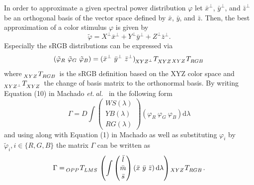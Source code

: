 \documentclass{sig-alternate-05-2015}
\newcommand{\etal}{\textit{et. al.}}
\newcommand{\dlambda}{\mathrm{d}\lambda}
\begin{document}
In order to approximate a given spectral power distribution $\varphi$ let $\bar x^\perp$, $\bar y^\perp$, and $\bar z^\perp$ be an orthogonal basis of the vector space defined by $\bar x$, $\bar y$, and $\bar z$.
Then, the best approximation of a color stimulus $\varphi$ is given by
\begin{equation}
    \tilde\varphi = X^\perp \bar x^\perp + Y^\perp \bar y^\perp + Z^\perp \bar z^\perp.
\end{equation}
Especially the sRGB distributions can be expressed via
\begin{equation}
    (\tilde\varphi_R\ \tilde\varphi_G\ \tilde\varphi_B) = (\bar x^\perp\ \bar y^\perp\ \bar z^\perp) \tensor[_{XYZ^\perp}]{T}{_{XYZ}} \tensor[_{XYZ}]{T}{_{RGB}}
\end{equation}
where $\tensor[_{XYZ}]{T}{_{RGB}}$ is the sRGB definition based on the XYZ color space and $\tensor[_{XYZ^\perp}]{T}{_{XYZ}}$ the change of basis matrix to the orthonormal basis.
By writing Equation (10) in Machado \etal~\cite{Machado2009} in the following form
\begin{equation}
    \Gamma = 
    D
    \int
    \begin{pmatrix} WS(\lambda) \\ YB(\lambda) \\ RG(\lambda) \end{pmatrix}
    \left( \varphi_R\ \varphi_G\ \varphi_B \right)
    \dlambda
\end{equation}
and using  along with Equation (1) in Machado as well as substituting $\varphi_i$ by $\tilde\varphi_i, i \in \{R, G, B\}$ the matrix $\Gamma$ can be written as
\begin{equation}
    \label{eqn:gamma}
    \Gamma =
    \tensor[_{OPP}]{T}{_{LMS}}
    \left(
        \int
        \begin{pmatrix} \bar l \\ \bar m \\ \bar s \end{pmatrix}
        \left( \bar x\ \bar y\ \bar z \right)
        \dlambda
    \right)
    \tensor[_{XYZ}]{T}{_{RGB}}.
\end{equation}
\end{document}
